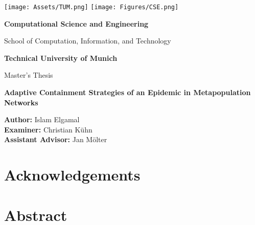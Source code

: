 
% 
\begin{titlepage}
    \centering
    \vspace*{1cm}
    
    \texttt{[image: Assets/TUM.png]}
    \hspace{.5cm}
    \texttt{[image: Figures/CSE.png]}
    
    \vspace{.25cm}
    \LARGE
    \textbf{Computational Science and Engineering}
    
    \vspace{.5cm}
    \Large
    School of Computation, Information, and Technology
    
    \vspace{1.5cm}
    
    \textbf{Technical University of Munich}
    
    \vspace{2cm}
    
    \Large
    Master's Thesis
    
    \vspace{0.5cm}
    
    \textbf{Adaptive Containment Strategies of an Epidemic in Metapopulation Networks}
    
    \vspace{2cm}
    
    \Large
    \textbf{Author:}    Islam Elgamal\\
    \textbf{Examiner:}    Christian Kühn\\
    \textbf{Assistant Advisor:}    Jan Mölter

    \vspace{2cm}
    
    
\end{titlepage}
\newpage

\section*{Acknowledgements}

\newpage


\section*{Abstract}

